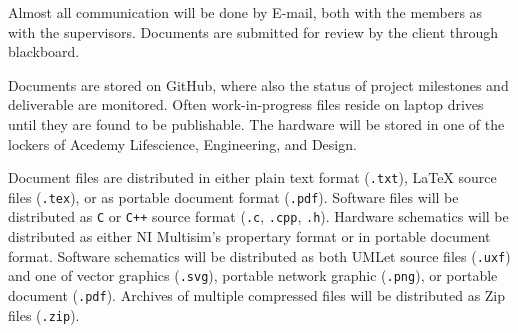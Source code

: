 Almost all communication will be done by E-mail, both with the members as with the supervisors. Documents are submitted for review by the client through blackboard.

Documents are stored on GitHub\cite{github}, where also the status of project milestones and deliverable are monitored. Often work-in-progress files reside on laptop drives until they are found to be publishable.  The hardware will be stored in one of the lockers of Acedemy Lifescience, Engineering, and Design.

Document files are distributed in either plain text format (\verb+.txt+), \LaTeX{} source files (\verb+.tex+), or as portable document format (\verb+.pdf+). Software files will be distributed as \verb+C+ or \verb-C++- source format (\verb+.c+, \verb+.cpp+, \verb+.h+). Hardware schematics will be distributed as either NI Multisim's propertary format or in portable document format. Software schematics will be distributed as both UMLet source files (\verb+.uxf+) and one of vector graphics (\verb+.svg+), portable network graphic (\verb+.png+), or portable document (\verb+.pdf+). Archives of multiple compressed files will be distributed as Zip files (\verb+.zip+).

